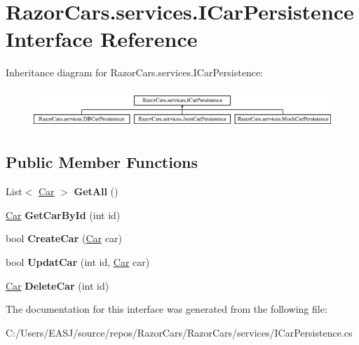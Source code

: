 \hypertarget{interface_razor_cars_1_1services_1_1_i_car_persistence}{}\section{Razor\+Cars.\+services.\+I\+Car\+Persistence Interface Reference}
\label{interface_razor_cars_1_1services_1_1_i_car_persistence}
Inheritance diagram for Razor\+Cars.\+services.\+I\+Car\+Persistence\+:\begin{figure}[H]
\begin{center}
\leavevmode
\includegraphics[height=1.469816cm]{interface_razor_cars_1_1services_1_1_i_car_persistence}
\end{center}
\end{figure}
\subsection*{Public Member Functions}
\begin{DoxyCompactItemize}
\item 
\mbox{\label{interface_razor_cars_1_1services_1_1_i_car_persistence_a5cc3465673ca7596cdb450e221e2f483}} 
List$<$ \mbox{\hyperlink{class_razor_cars_1_1model_1_1_car}{Car}} $>$ {\bfseries Get\+All} ()
\item 
\mbox{\label{interface_razor_cars_1_1services_1_1_i_car_persistence_a335d97e8c027ac2b7340b5b02656d05b}} 
\mbox{\hyperlink{class_razor_cars_1_1model_1_1_car}{Car}} {\bfseries Get\+Car\+By\+Id} (int id)
\item 
\mbox{\label{interface_razor_cars_1_1services_1_1_i_car_persistence_a6ec4efbd74888d1aa3c5a890f8d52458}} 
bool {\bfseries Create\+Car} (\mbox{\hyperlink{class_razor_cars_1_1model_1_1_car}{Car}} car)
\item 
\mbox{\label{interface_razor_cars_1_1services_1_1_i_car_persistence_ad5601914a13e2a85bcb84095579f1bcb}} 
bool {\bfseries Updat\+Car} (int id, \mbox{\hyperlink{class_razor_cars_1_1model_1_1_car}{Car}} car)
\item 
\mbox{\label{interface_razor_cars_1_1services_1_1_i_car_persistence_a38e8d4c14ef3043b48bcdd5406989e2a}} 
\mbox{\hyperlink{class_razor_cars_1_1model_1_1_car}{Car}} {\bfseries Delete\+Car} (int id)
\end{DoxyCompactItemize}


The documentation for this interface was generated from the following file\+:\begin{DoxyCompactItemize}
\item 
C\+:/\+Users/\+E\+A\+S\+J/source/repos/\+Razor\+Cars/\+Razor\+Cars/services/I\+Car\+Persistence.\+cs\end{DoxyCompactItemize}
